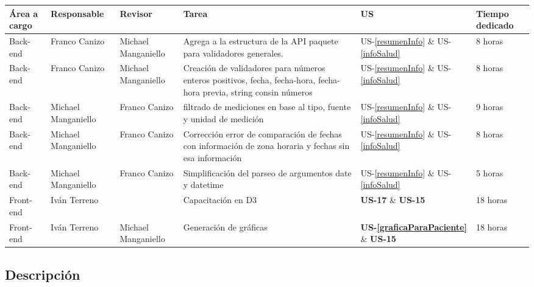 	{\scriptsize
	\begin{center} %
	\centering
    \resizebox{\textwidth}{!}
    {
	\begin{tabular}{|l|l|l|p{5cm}|l|p{1cm}|}
		\hline
		\textbf{Área a cargo} &
		\textbf{Responsable} &        
		\textbf{Revisor} &        	        
		\textbf{Tarea} &
		\textbf{US} &
		\textbf{Tiempo dedicado} \\
   		\hline
       
	    Back-end& Franco Canizo& Michael Manganiello & Agrega a la estructura de la API paquete para validadores generales.  & US-\ref{resumenInfo} \& US-\ref{infoSalud}& 8 horas\\ \hline
	    Back-end& Franco Canizo& Michael Manganiello & Creación de validadores para números enteros positivos, fecha, fecha-hora, fecha-hora previa, string con\/sin números  & US-\ref{resumenInfo} \& US-\ref{infoSalud} & 8 horas\\ \hline
	    Back-end& Michael Manganiello& Franco Canizo & filtrado de mediciones en base al tipo, fuente y unidad de medición & US-\ref{resumenInfo} \& US-\ref{infoSalud}& 9 horas \\ \hline
	    Back-end& Michael Manganiello& Franco Canizo & Corrección error de comparación de fechas con información de zona horaria y fechas sin esa información & US-\ref{resumenInfo} \& US-\ref{infoSalud} & 8 horas\\ \hline
	    Back-end& Michael Manganiello& Franco Canizo & Simplificación del parseo de argumentos date y datetime & US-\ref{resumenInfo} \& US-\ref{infoSalud} & 5 horas \\ \hline        
   	    Front-end& Iván Terreno & & Capacitación en D3 & \textbf{US-17} \& \textbf{US-15} & 18 horas \\ \hline
   	    Front-end& Iván Terreno& Michael Manganiello & Generación de gráficas & \textbf{US-\ref{graficaParaPaciente}} \& \textbf{US-15} & 18 horas \\ \hline        
	    \end{tabular}
        }
    	\end{center}
	}


\subsection{Descripción}

